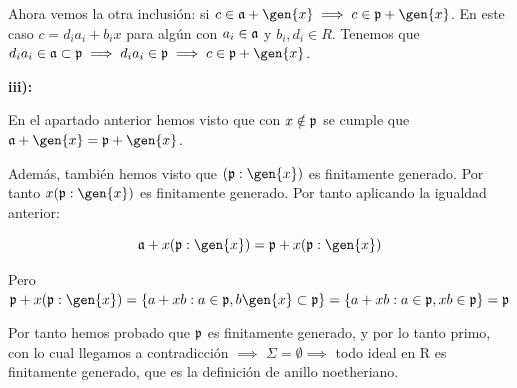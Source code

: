 \begin{problem}[1]
	Ahora vemos la otra inclusión: si $c \in \aideal + \gen{x} \implies c \in \pideal + \gen{x}$. En este caso $c = d_ia_i+b_ix$ para algún con $a_i \in \mathfrak{a}$ y $b_i, d_i \in R$. Tenemos que $d_ia_i \in \aideal \subset \pideal \implies d_ia_i \in \pideal \implies c \in \pideal + \gen{x}$.

	\textbf{iii):}

	En el apartado anterior hemos visto que con $x \notin \mathfrak{p}$ se cumple que $\aideal+\gen{x}=\pideal +\gen{x}$.

	Además, también hemos visto que $(\pideal:\gen{x})$ es finitamente generado. Por tanto $x(\pideal:\gen{x})$ es finitamente generado. Por tanto aplicando la igualdad anterior:

	$$\aideal + x(\pideal: \gen{x}) = \pideal + x(\pideal: \gen{x})$$

	Pero $\pideal + x(\pideal: \gen{x}) = \{ a+xb : a\in \pideal,  b \gen{x} \subset \pideal \} = \{ a+xb : a\in \pideal,  xb \in \pideal \} = \pideal$

	\spart

	Por tanto hemos probado que $\mathfrak{p}$ es finitamente generado, y por lo tanto primo, con lo cual llegamos a contradicción $\implies$ $\Sigma = \emptyset \implies$ todo ideal en R es finitamente generado, que es la definición de anillo noetheriano.
\end{problem}

